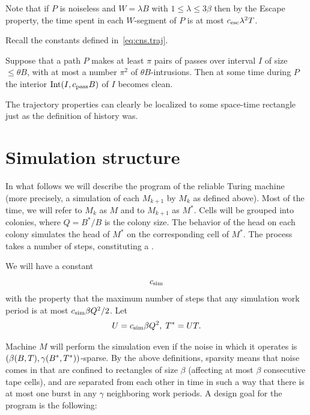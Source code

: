 \documentclass[11pt]{memoir}
\theoremstyle{definition} %
\renewcommand{\le}{\leq}
\def\B{B}
\def\U{U}
\newcommand{\Int}{\mathrm{Int}}
\newcommand{\passno}{\pi}
\newcommand{\Q}{Q}
\newcommand{\Tu}{T}
\newcommand{\Tus}{T^{*}}
\newcommand{\cns}[1]{c_{\textrm{\upshape #1}}}
\newcommand{\CEsc}{\cns{esc}}
\newcommand{\CPass}{\cns{pass}}
\newcommand{\CSim}{\cns{sim}}
\begin{document}
Note that if \( P \) is noiseless and \( W=\lambda\B \) with \( 1\le \lambda\le 3\beta \) then
by the Escape property,
the time spent in each \( W \)-segment of \( P \) is at most \( \CEsc\lambda^{2}\Tu \).

Recall the constants defined in~\eqref{eq:cns.traj}.

\begin{definition}\label{def:pass-cleaning}
  Suppose that a path \( P \) makes at least \( \passno \) pairs of passes over interval \( I \)
  of size \( \le\theta\B \), with at most
  a number \( \passno^{2} \) of \( \theta\B \)-intrusions.
  Then at some time during \( P \) the interior \( \Int(I, \CPass\B) \) of \( I \) becomes clean.
 \end{definition}

The trajectory properties can clearly be localized to some space-time
rectangle just as the definition of history was.


\section{Simulation structure}

In what follows we will describe the program of the reliable Turing machine
(more precisely, a simulation of each \( M_{k+1} \) by \( M_{k} \) as defined above).
Most of the time, we will refer to \( M_{k} \) as \( M \) and to \( M_{k+1} \) as \( M^{*} \).
Cells will be grouped into colonies, where  \( \Q=\B^{*}/\B \) is the colony size.
The behavior of the head on
each colony simulates the head of \( M^{*} \) on the corresponding cell
of \( M^{*} \).
The process takes a number of steps, constituting a .

\begin{definition}\label{def:Tu}
  We will have a constant
   \begin{align}\label{eq:CU-def}
   \CSim 
   \end{align}
   with the property that the maximum number of steps that any simulation work period
   is at most \( \CSim\beta\Q^{2}/2 \). %
   Let 
\begin{align*}
 \U=\CSim\beta\Q^{2},\; \Tus=\U\Tu.
\end{align*}

\end{definition}

Machine \( M \) will perform the simulation even if the noise
in which it operates is \( (\beta\pair{\B}{\Tu}, \gamma\pair{\B^{*}}{\Tus}) \)-sparse.
By the above definitions, 
sparsity means that noise comes in  that are confined to
rectangles of size \( \beta \) (affecting at most \( \beta \) consecutive tape cells), 
and are separated from each other in time in such a way that there is at most one burst
in any \( \gamma \) neighboring work periods.
A design goal for the program is the following:
\end{document}

